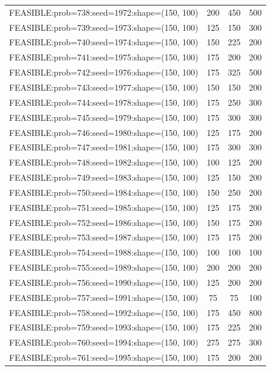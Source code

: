 \begin{longtable}{lccc}
FEASIBLE:prob=738:seed=1972:shape=(150, 100) &  200 &   450 &    500 \\
FEASIBLE:prob=739:seed=1973:shape=(150, 100) &  125 &   150 &    300 \\
FEASIBLE:prob=740:seed=1974:shape=(150, 100) &  150 &   225 &    200 \\
FEASIBLE:prob=741:seed=1975:shape=(150, 100) &  175 &   200 &    200 \\
FEASIBLE:prob=742:seed=1976:shape=(150, 100) &  175 &   325 &    500 \\
FEASIBLE:prob=743:seed=1977:shape=(150, 100) &  150 &   150 &    200 \\
FEASIBLE:prob=744:seed=1978:shape=(150, 100) &  175 &   250 &    300 \\
FEASIBLE:prob=745:seed=1979:shape=(150, 100) &  175 &   300 &    300 \\
FEASIBLE:prob=746:seed=1980:shape=(150, 100) &  125 &   175 &    200 \\
FEASIBLE:prob=747:seed=1981:shape=(150, 100) &  175 &   300 &    300 \\
FEASIBLE:prob=748:seed=1982:shape=(150, 100) &  100 &   125 &    200 \\
FEASIBLE:prob=749:seed=1983:shape=(150, 100) &  125 &   150 &    200 \\
FEASIBLE:prob=750:seed=1984:shape=(150, 100) &  150 &   250 &    200 \\
FEASIBLE:prob=751:seed=1985:shape=(150, 100) &  125 &   175 &    200 \\
FEASIBLE:prob=752:seed=1986:shape=(150, 100) &  150 &   175 &    200 \\
FEASIBLE:prob=753:seed=1987:shape=(150, 100) &  175 &   175 &    200 \\
FEASIBLE:prob=754:seed=1988:shape=(150, 100) &  100 &   100 &    100 \\
FEASIBLE:prob=755:seed=1989:shape=(150, 100) &  200 &   200 &    200 \\
FEASIBLE:prob=756:seed=1990:shape=(150, 100) &  125 &   200 &    200 \\
FEASIBLE:prob=757:seed=1991:shape=(150, 100) &   75 &    75 &    100 \\
FEASIBLE:prob=758:seed=1992:shape=(150, 100) &  175 &   450 &    800 \\
FEASIBLE:prob=759:seed=1993:shape=(150, 100) &  175 &   225 &    200 \\
FEASIBLE:prob=760:seed=1994:shape=(150, 100) &  275 &   275 &    300 \\
FEASIBLE:prob=761:seed=1995:shape=(150, 100) &  175 &   200 &    200 \\

\end{longtable}
